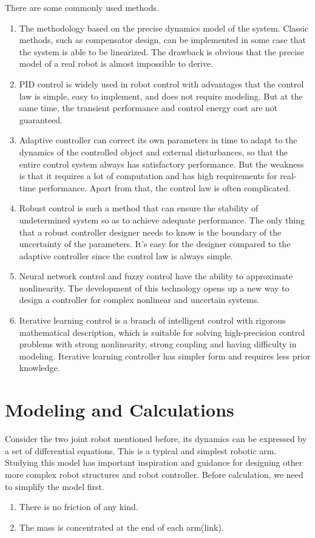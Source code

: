 \documentclass[a4paper]{article}
\begin{document}
There are some commonly used methods. 
\begin{enumerate}
   \item The methodology based on the precise dynamics model of the system. Classic methods, such as compensator design, can be implemented in some case that the system is able to be linearized. The drawback is obvious that the precise model of a real robot is almost impossible to derive. 
   \item PID control is widely used in robot control with advantages that the control law is simple, easy to implement, and does not require modeling. But at the same time, the transient performance and control energy cost are not guaranteed. 
   \item Adaptive controller can correct its own parameters in time to adapt to the dynamics of the controlled object and external disturbances, so that the entire control system always has satisfactory performance. But the weakness is that it requires a lot of computation and has high requirements for real-time performance. Apart from that, the control law is often complicated.
   \item Robust control is such a method that can ensure the stability of undetermined system so as to achieve adequate performance. The only thing that a robust controller designer needs to know is the boundary of the uncertainty of the parameters. It’s easy for the designer compared to the adaptive controller since the control law is always simple. 
   \item Neural network control and fuzzy control have the ability to approximate nonlinearity. The development of this technology opens up a new way to design a controller for complex nonlinear and uncertain systems.
   \item Iterative learning control is a branch of intelligent control with rigorous mathematical description, which is suitable for solving high-precision control problems with strong nonlinearity, strong coupling and having difficulty in modeling. Iterative learning controller has simpler form and requires less prior knowledge. 
\end{enumerate}



\section{Modeling and Calculations}

Consider the two joint robot mentioned before, its dynamics can be expressed by a set of differential equations. This is a typical and simplest robotic arm. Studying this model has important inspiration and guidance for designing other more complex robot structures and robot controller. Before calculation, we need to simplify the model first.
\begin{enumerate}
   \item There is no friction of any kind.
   \item The mass is concentrated at the end of each arm(link).
\end{enumerate}
\end{document}
